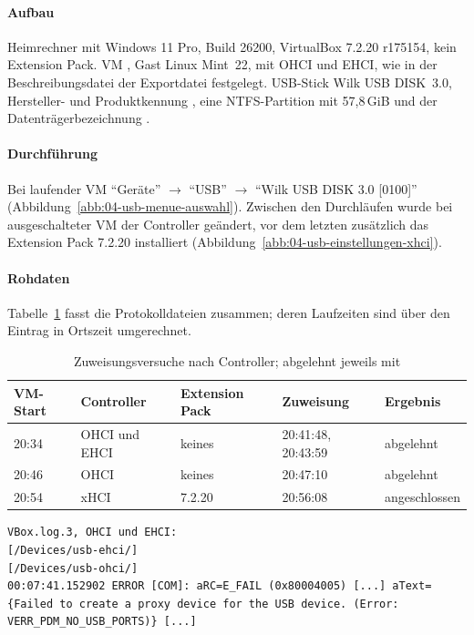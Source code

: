 \begin{messung}
\paragraph{Aufbau} Heimrechner mit Windows 11 Pro, Build 26200, VirtualBox 7.2.20 r175154, kein Extension Pack. VM , Gast Linux Mint~22, mit OHCI und EHCI, wie in der Beschreibungsdatei der Exportdatei festgelegt. USB-Stick Wilk USB DISK~3.0, Hersteller- und Produktkennung , eine NTFS-Partition mit 57,8\,GiB und der Datenträgerbezeichnung .

\paragraph{Durchführung} Bei laufender VM \enquote{Geräte} $\rightarrow$ \enquote{USB} $\rightarrow$ \enquote{Wilk USB DISK 3.0 [0100]} (Abbildung~\ref{abb:04-usb-menue-auswahl}). Zwischen den Durchläufen wurde bei ausgeschalteter VM der Controller geändert, vor dem letzten zusätzlich das Extension Pack 7.2.20 installiert (Abbildung~\ref{abb:04-usb-einstellungen-xhci}).

\paragraph{Rohdaten} Tabelle~\ref{tab:usb-controller} fasst die Protokolldateien  zusammen; deren Laufzeiten sind über den Eintrag  in Ortszeit umgerechnet.

\begin{table}[H]
\centering
\caption{Zuweisungsversuche nach Controller; abgelehnt jeweils mit }
\label{tab:usb-controller}
\begin{tabularx}{\textwidth}{@{}llllX@{}}
\toprule
\textbf{VM-Start} & \textbf{Controller} & \textbf{Extension Pack} & \textbf{Zuweisung} & \textbf{Ergebnis} \\
\midrule
20:34 & OHCI und EHCI & keines & 20:41:48, 20:43:59 & abgelehnt \\
20:46 & OHCI & keines & 20:47:10 & abgelehnt \\
20:54 & xHCI & 7.2.20 & 20:56:08 & angeschlossen \\
\bottomrule
\end{tabularx}
\end{table}

\begin{lstlisting}[caption={Auszug aus den Protokolldateien der VM, Zeilen gekürzt},label={lst:usb-log}]
VBox.log.3, OHCI und EHCI:
[/Devices/usb-ehci/]
[/Devices/usb-ohci/]
00:07:41.152902 ERROR [COM]: aRC=E_FAIL (0x80004005) [...] aText={Failed to create a proxy device for the USB device. (Error: VERR_PDM_NO_USB_PORTS)} [...]


\end{lstlisting}
\end{messung}
